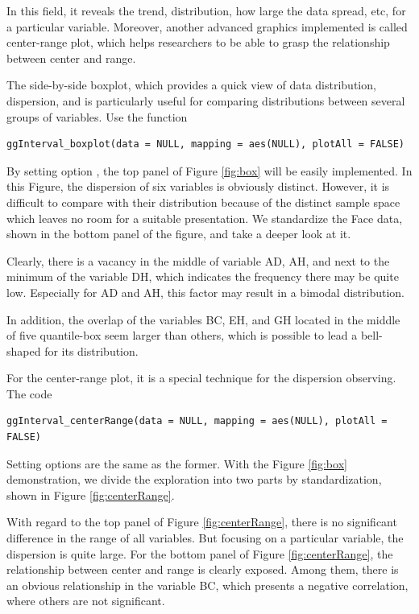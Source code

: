 \documentclass[article]{jss}
\begin{document}
In this field, it reveals the trend, distribution, how large the data spread, etc, for a particular variable. Moreover, another advanced graphics implemented is called center-range plot, which helps researchers to be able to grasp the relationship between center and range. 

The side-by-side boxplot, which provides a quick view of data distribution, dispersion, and is particularly useful for comparing distributions between several groups of variables. Use the function

\begin{verbatim}
ggInterval_boxplot(data = NULL, mapping = aes(NULL), plotAll = FALSE)
\end{verbatim}

By setting option , the top panel of Figure \ref{fig:box} will be easily implemented. In this Figure, the dispersion of six variables is obviously distinct. However, it is difficult to compare with their distribution because of the distinct sample space which leaves no room for a suitable presentation. We standardize the Face data, shown in the bottom panel of the figure, and take a deeper look at it.


Clearly, there is a vacancy in the middle of variable AD, AH, and next to the minimum of the variable DH, which indicates the frequency there may be quite low. Especially for AD and AH, this factor may result in a bimodal distribution.

In addition, the overlap of the variables BC, EH, and GH located in the middle of five quantile-box seem larger than others, which is possible to lead a bell-shaped for its distribution.

For the center-range plot, it is a special technique for the dispersion observing. The code

\begin{verbatim}
ggInterval_centerRange(data = NULL, mapping = aes(NULL), plotAll = FALSE)
\end{verbatim}

Setting options are the same as the former. With the Figure \ref{fig:box} demonstration, we divide the exploration into two parts by standardization, shown in Figure \ref{fig:centerRange}.

With regard to the top panel of Figure \ref{fig:centerRange}, there is no significant difference in the range of all variables. But focusing on a particular variable, the dispersion is quite large. For the bottom panel of Figure \ref{fig:centerRange}, the relationship between center and range is clearly exposed. Among them, there is an obvious relationship in the variable BC, which presents a negative correlation, where others are not significant.
\end{document}
